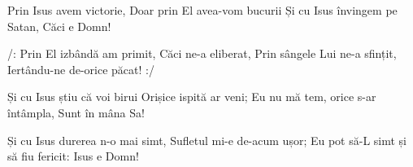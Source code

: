 \beginverse
Prin Isus avem victorie,
Doar prin El avea-vom bucurii
Și cu Isus învingem pe Satan,
Căci e Domn!
\endverse

\beginchorus
/: Prin El izbândă am primit,
Căci ne-a eliberat,
Prin sângele Lui ne-a sfințit,
Iertându-ne de-orice păcat! :/
\endchorus

\beginverse
Și cu Isus știu că voi birui
Orișice ispită ar veni;
Eu nu mă tem, orice s-ar întâmpla,
Sunt în mâna Sa!
\endverse

\beginverse
Și cu Isus durerea n-o mai simt,
Sufletul mi-e de-acum ușor;
Eu pot să-L simt și să fiu fericit:
Isus e Domn!
\endverse
\endsong